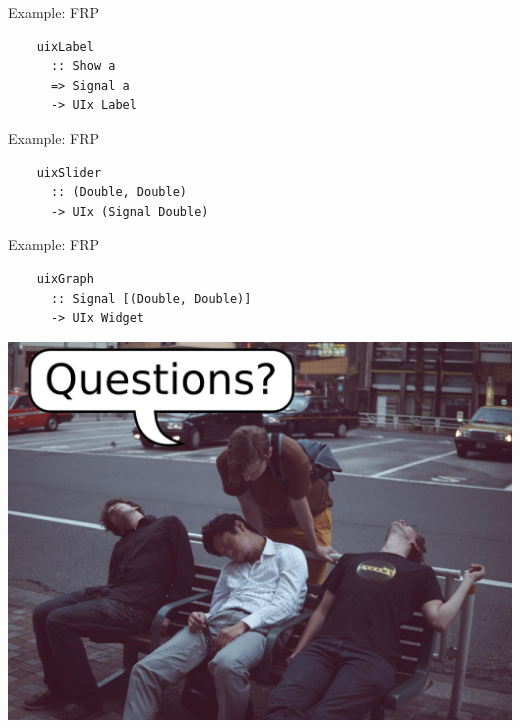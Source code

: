 \documentclass[20pt]{beamer}
\begin{document}
\begin{frame}[fragile]{Example: FRP}
    \begin{lstlisting}
    uixLabel
      :: Show a
      => Signal a
      -> UIx Label
    \end{lstlisting}
\end{frame}

\begin{frame}[fragile]{Example: FRP}
    \begin{lstlisting}
    uixSlider
      :: (Double, Double)
      -> UIx (Signal Double)
    \end{lstlisting}
\end{frame}

\begin{frame}[fragile]{Example: FRP}
    \begin{lstlisting}
    uixGraph
      :: Signal [(Double, Double)]
      -> UIx Widget
    \end{lstlisting}
\end{frame}


\begin{frame}[plain]
    \includegraphics[width=\textwidth]{images/questions.jpg}
\end{frame}
\end{document}
